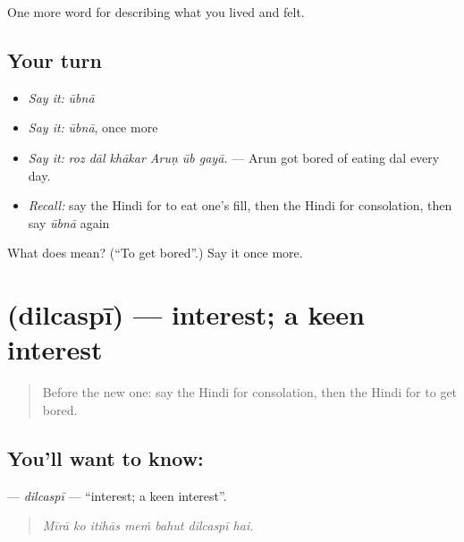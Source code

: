 \begin{grammarlens}[title={What you've built}]
One more word for describing what you lived and felt.
\end{grammarlens}

\subsection*{Your turn}
\begin{itemize}
\raggedright
  \item \emph{Say it:} \emph{ūbnā}
  \item \emph{Say it:} \emph{ūbnā}, once more
  \item \emph{Say it:} \emph{roz dāl khākar Aruṇ ūb gayā.} — Arun got bored of eating dal every day.
  \item \emph{Recall:} say the Hindi for to eat one's fill, then the Hindi for consolation, then say \emph{ūbnā} again
\end{itemize}

\begin{tcolorbox}[breakable,colback=teal!4,colframe=teal!35!black,title={Before you move on}]
What does  mean? (\textquotedblleft{}To get bored\textquotedblright{}.) Say it once more.
\end{tcolorbox}
\section[\texorpdfstring{\hi{दिलचस्पी} (dilcaspī)}{दिलचस्पी (dilcaspī)}]{ (dilcaspī) — interest; a keen interest}

\label{lesson:HI-C464-dilcaspi}



\begin{quote}
Before the new one: say the Hindi for consolation, then the Hindi for to get bored.
\end{quote}

\subsection*{You'll want to know: }
\textbf{} — \emph{dilcaspī} — \textquotedblleft{}interest; a keen interest\textquotedblright{}.

\begin{quote}
      
\end{quote}

\begin{quote}
\emph{Mīrā ko itihās meṁ bahut dilcaspī hai.}
\end{quote}

